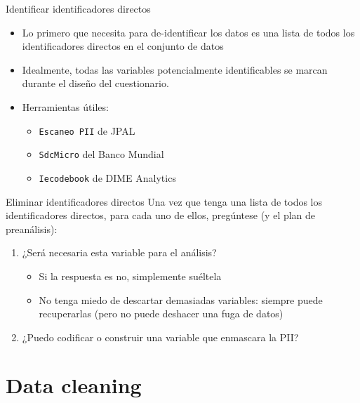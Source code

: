 \documentclass[10pt, aspectratio=169, compress]{beamer}
\begin{document}
\begin{frame}[t]{Identificar identificadores directos}
	\begin{itemize}
		\item Lo primero que necesita para de-identificar los datos es una lista de todos los identificadores directos en el conjunto de datos
		\item Idealmente, todas las variables potencialmente identificables se marcan durante el diseño del cuestionario.
		\item Herramientas útiles:
		\begin{itemize}
			\item \texttt{Escaneo PII} de JPAL
			\item \texttt{SdcMicro} del Banco Mundial
			\item \texttt{Iecodebook} de DIME Analytics
		\end{itemize}
	\end{itemize}
\end{frame}
\begin{frame}[t]{Eliminar identificadores directos}
	Una vez que tenga una lista de todos los identificadores directos, para cada uno de ellos, pregúntese (y el plan de preanálisis):
	\begin{enumerate}
		\item ¿Será necesaria esta variable para el análisis?
	\begin{itemize}
		\item Si la respuesta es no, simplemente suéltela
		\item No tenga miedo de descartar demasiadas variables: siempre puede recuperarlas (pero no puede deshacer una fuga de datos)
	\end{itemize}
	\item ¿Puedo codificar o construir una variable que enmascara la PII?
	\end{enumerate}
\end{frame}
\section{Data cleaning}
\end{document}
